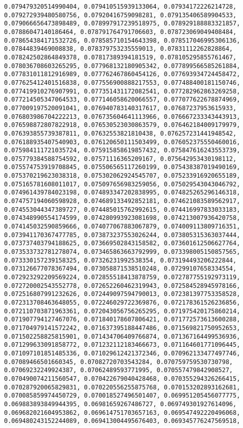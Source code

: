 \documentclass[11pt]{article}
\begin{document}
\begin{Verbatim}[commandchars=\\\{\}]
0.079479320514990404, 0.079410515939133064, 0.07934172226214728, 0.079272939480580756, 0.07920416759098281, 0.079135406589904533, 0.079066656473898489, 0.078997917239518975, 0.078929188883321857, 0.07886047140186464, 0.078791764791706603, 0.078723069049408484, 0.078654384171532726, 0.078585710154643398, 0.078517046995306136, 0.07844839469008838, 0.078379753235559013, 0.07831112262828864, 0.078242502864849378, 0.07817389394181519, 0.078105295855761467, 0.078036708603265295, 0.077968132180905342, 0.077899566585261884, 0.077831011812916989, 0.077762467860454126, 0.077693934724458472, 0.077625412401516838, 0.077556900888217553, 0.077488400181150746, 0.077419910276907991, 0.077351431172082541, 0.077282962863269258, 0.077214505347064533, 0.077146058620066557, 0.077077622678874969, 0.077009197520091041, 0.076940783140317617, 0.07687237953615933, 0.076803986704222213, 0.076735604641113966, 0.076667233343443913, 0.076598872807822918, 0.076530523030863579, 0.076462184009179979, 0.076393855739387811, 0.07632553821810438, 0.076257231441948542, 0.076188935407540903, 0.076120650111503499, 0.076052375550460016, 0.075984111721035724, 0.075915858619857432, 0.075847616243553739, 0.075779384588754592, 0.07571116365209167, 0.075642953430198112, 0.075574753919708845, 0.075506565117260199, 0.075438387019490169, 0.075370219623038318, 0.075302062924545707, 0.075233916920655189, 0.075165781608011017, 0.075097656983259056, 0.075029543043046792, 0.074961439784023198, 0.074893347202838995, 0.074825265296146318, 0.074757194060598928, 0.074689133492852181, 0.074621083589562917, 0.074553044347389727, 0.074485015762992615, 0.074416997833033183, 0.074348990554174599, 0.074280993923081698, 0.074213007936420758, 0.074145032590859666, 0.074077067883067879, 0.074009113809716351, 0.073941170367477785, 0.073873237553026244, 0.073805315363037444, 0.073737403794188625, 0.073669502843158582, 0.073601612506627764, 0.073533732781278074, 0.073465863663792999, 0.073398005150857565, 0.073330157239158325, 0.07326231992538354, 0.073194493206222844, 0.073126677078367494, 0.073058871538510248, 0.07299107658334554, 0.072923292209569224, 0.072855518413878759, 0.072787755192973119, 0.072720002543552778, 0.072652260462319943, 0.072584528945978166, 0.072516807991232626, 0.072449097594790013, 0.072381397753358528, 0.072313708463648055, 0.072246029722369876, 0.072178361526236856, 0.072110703871963361, 0.072043056756265295, 0.071975420175860214, 0.071907794127467076, 0.071840178607806421, 0.071772573613600288, 0.071704979141572242, 0.071637395188447486, 0.071569821750952653, 0.071502258825815901, 0.071434706409766874, 0.071367164499536936, 0.071299633091858772, 0.071232112183466673, 0.071164601771096445, 0.071097101851485336, 0.071029612421372346, 0.070962133477497746, 0.07089466501660345, 0.07082720703543284, 0.070759759530730798, 0.07069232249924387, 0.07062489593771995, 0.070557479842908527, 0.070490074211560547, 0.070422679040428468, 0.070355294326266415, 0.070287920065829831, 0.070220556255875768, 0.070153202893162681, 0.070085859974450729, 0.070018527496501407, 0.069951205456077775, 0.069883893849944395, 0.06981659267486727, 0.069749301927614096, 0.069682021604953862, 0.069614751703657163, 0.069547492220496068, 0.069480243152244089, 0.069413004495676403, 0.069345776247569518, 
\end{Verbatim}
\end{document}
